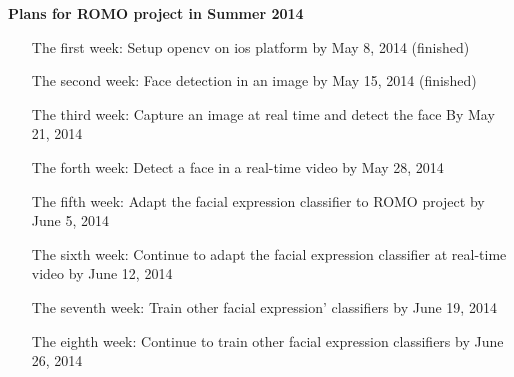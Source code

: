 \documentclass[a4paper,10pt]{article}
\begin{document}
\textbf{Plans for ROMO project in Summer 2014} \newline
\begin{itemize}
   \item[The first week:] Setup opencv on ios platform by May 8, 2014 (finished)
   \item[The second week:] Face detection in an image by May 15, 2014 (finished)
   \item[The third week:] Capture an image at real time and detect the face By May 21, 2014
   \item[The forth week:] Detect a face in a real-time video by May 28, 2014
   \item[The fifth week:] Adapt the facial expression classifier to ROMO project by June 5, 2014
   \item[The sixth week:] Continue to adapt the facial expression classifier at real-time video by June 12, 2014
   \item[The seventh week:] Train other facial expression' classifiers by June 19, 2014
   \item[The eighth week:] Continue to train other facial expression classifiers by June 26, 2014
\end{itemize}
\end{document}
